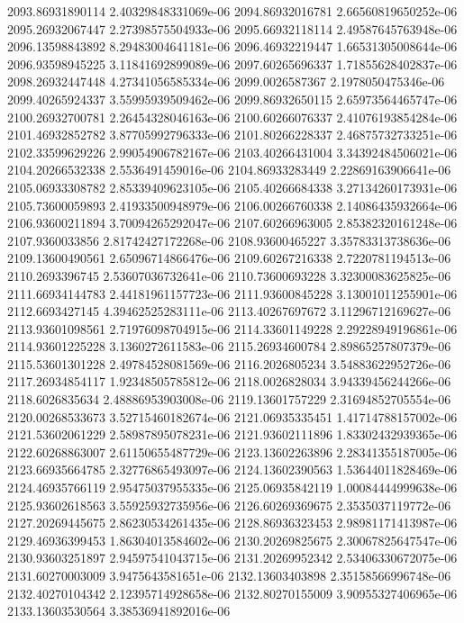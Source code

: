 {2093.86931890114 2.40329848331069e-06
2094.86932016781 2.66560819650252e-06
2095.26932067447 2.27398575504933e-06
2095.66932118114 2.49587645763948e-06
2096.13598843892 8.29483004641181e-06
2096.46932219447 1.66531305008644e-06
2096.93598945225 3.11841692899089e-06
2097.60265696337 1.71855628402837e-06
2098.26932447448 4.27341056585334e-06
2099.0026587367 2.1978050475346e-06
2099.40265924337 3.55995939509462e-06
2099.86932650115 2.65973564465747e-06
2100.26932700781 2.26454328046163e-06
2100.60266076337 2.41076193854284e-06
2101.46932852782 3.87705992796333e-06
2101.80266228337 2.46875732733251e-06
2102.33599629226 2.99054906782167e-06
2103.40266431004 3.34392484506021e-06
2104.20266532338 2.5536491459016e-06
2104.86933283449 2.22869163906641e-06
2105.06933308782 2.85339409623105e-06
2105.40266684338 3.27134260173931e-06
2105.73600059893 2.41933500948979e-06
2106.00266760338 2.14086435932664e-06
2106.93600211894 3.70094265292047e-06
2107.60266963005 2.85382320161248e-06
2107.9360033856 2.81742427172268e-06
2108.93600465227 3.35783313738636e-06
2109.13600490561 2.65096714866476e-06
2109.60267216338 2.7220781194513e-06
2110.2693396745 2.53607036732641e-06
2110.73600693228 3.32300083625825e-06
2111.66934144783 2.44181961157723e-06
2111.93600845228 3.13001011255901e-06
2112.6693427145 4.39462525283111e-06
2113.40267697672 3.11296712169627e-06
2113.93601098561 2.71976098704915e-06
2114.33601149228 2.29228949196861e-06
2114.93601225228 3.1360272611583e-06
2115.26934600784 2.89865257807379e-06
2115.53601301228 2.49784528081569e-06
2116.2026805234 3.54883622952726e-06
2117.26934854117 1.92348505785812e-06
2118.0026828034 3.94339456244266e-06
2118.6026835634 2.48886953903008e-06
2119.13601757229 2.31694852705554e-06
2120.00268533673 3.52715460182674e-06
2121.06935335451 1.41714788157002e-06
2121.53602061229 2.58987895078231e-06
2121.93602111896 1.83302432939365e-06
2122.60268863007 2.61150655487729e-06
2123.13602263896 2.28341355187005e-06
2123.66935664785 2.32776865493097e-06
2124.13602390563 1.53644011828469e-06
2124.46935766119 2.95475037955335e-06
2125.06935842119 1.00084444999638e-06
2125.93602618563 3.55925932735956e-06
2126.60269369675 2.3535037119772e-06
2127.20269445675 2.86230534261435e-06
2128.86936323453 2.98981171413987e-06
2129.46936399453 1.86304013584602e-06
2130.20269825675 2.30067825647547e-06
2130.93603251897 2.94597541043715e-06
2131.20269952342 2.53406330672075e-06
2131.60270003009 3.9475643581651e-06
2132.13603403898 2.35158566996748e-06
2132.40270104342 2.12395714928658e-06
2132.80270155009 3.90955327406965e-06
2133.13603530564 3.38536941892016e-06
}
